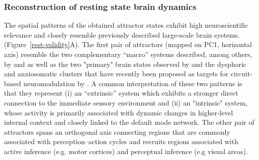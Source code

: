 \documentclass{article}
\begin{document}
\subsubsection{Reconstruction of resting state brain dynamics}\label{Reconstruction of resting state brain dynamics}

The spatial patterns of the obtained attractor states exhibit high neuroscientific relevance and closely resemble previously described large-scale brain systems. (Figure~\ref{rest-validity}A). The first pair of attractors (mapped on PC1, horizontal axis) resemble the two complementary ``macro'' systems described, among others, by \citet{golland2008data} and \citet{cioli2014differences} as well as the two "primary" brain states observed by \citet{chen2018human} and the dysphoric and anxiosomatic clusters that have recently been proposed as targets for circuit-based neuromodulation by \citet{siddiqi2020distinct}. A common interpretation of these two patterns is that they represent (i) an ``extrinsic'' system which exhibits a stronger direct connection to the immediate sensory environment and (ii) an "intrinsic" system, whose activity is primarily associated with dynamic changes in higher-level internal context and closely linked to the default mode network.
The other pair of attractors spans an orthogonal axis connecting regions that are commonly associated with perception--action cycles \citep{fuster2004upper} and recruits regions associated with active inference (e.g. motor cortices) and perceptual inference (e.g visual areas).
\end{document}
